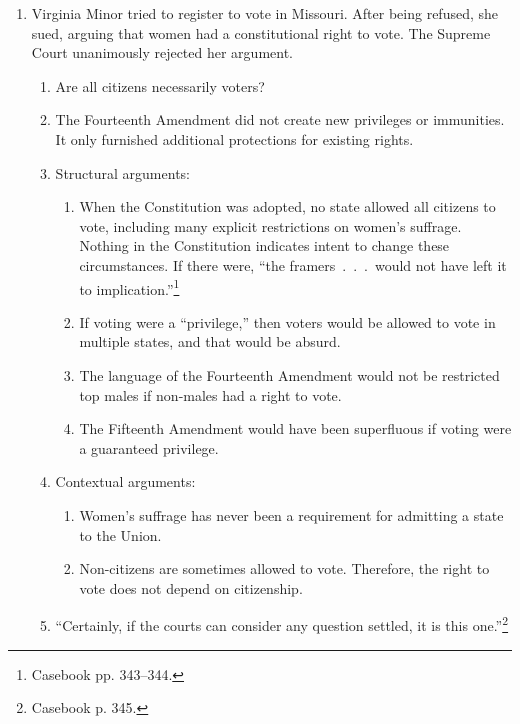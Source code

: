 \begin{enumerate}
    \item Virginia Minor tried to register to vote in Missouri. After being 
    refused, she sued, arguing that women had a constitutional right to vote. 
    The Supreme Court unanimously rejected her argument.
    \begin{enumerate}
        \item Are all citizens necessarily voters?
        \item The Fourteenth Amendment did not create new privileges or 
        immunities. It only furnished additional protections for existing 
        rights.
        \item Structural arguments:
        \begin{enumerate}
            \item When the Constitution was adopted, no state allowed all 
            citizens to vote, including many explicit restrictions on women's 
            suffrage. Nothing in the Constitution indicates intent to change 
            these circumstances. If there were, ``the framers~.~.~.~would not 
            have left it to implication.''\footnote{Casebook pp. 343--344.}
            \item If voting were a ``privilege,'' then voters would be allowed 
            to vote in multiple states, and that would be absurd.
            \item The language of the Fourteenth Amendment would not be 
            restricted top males if non-males had a right to vote.
            \item The Fifteenth Amendment would have been superfluous if 
            voting were a guaranteed privilege.
        \end{enumerate}
        \item Contextual arguments:
        \begin{enumerate}
            \item Women's suffrage has never been a requirement for admitting 
            a state to the Union.
            \item Non-citizens are sometimes allowed to vote. Therefore, the 
            right to vote does not depend on citizenship.
        \end{enumerate}
        \item ``Certainly, if the courts can consider any question settled, it 
        is this one.''\footnote{Casebook p. 345.}
    \end{enumerate}
\end{enumerate}
 
